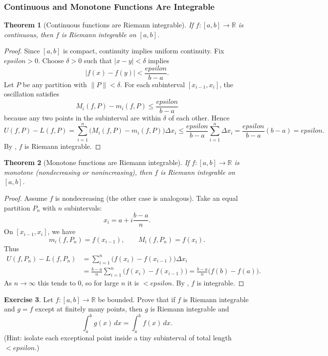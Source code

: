 \documentclass[12pt]{article}
\numberwithin{equation}{section}
\def\abs#1{|#1|}
\def\eps{epsilon}
\def\diff{d}
\newcommand{\RR}{\mathbb{R}}
\DeclarePairedDelimiter{\abs}{\lvert}{\rvert}
\newcommand{\eps}{\varepsilon}               %
\newcommand{\diff}{\mathop{}\!\mathrm{d}}    %
\theoremstyle{plain}
\newtheorem{theorem}{Theorem}[section]
\theoremstyle{definition}
\newtheorem{exercise}[theorem]{Exercise}
\theoremstyle{remark}
\begin{document}
\subsubsection{Continuous and Monotone Functions Are Integrable}

\begin{theorem}[Continuous functions are Riemann integrable]\label{thm:cont-int}
If $f:[a,b]\to\RR$ is continuous, then $f$ is Riemann integrable on $[a,b]$.
\end{theorem}

\begin{proof}
Since $[a,b]$ is compact, continuity implies uniform continuity.
Fix $\eps>0$.
Choose $\delta>0$ such that $\abs{x-y}<\delta$ implies
\[
\abs{f(x)-f(y)}<\frac{\eps}{b-a}.
\]
Let $P$ be any partition with $\|P\|<\delta$.
For each subinterval $[x_{i-1},x_i]$, the oscillation satisfies
\[
M_i(f,P)-m_i(f,P)\le \frac{\eps}{b-a}
\]
because any two points in the subinterval are within $\delta$ of each other.
Hence
\[
U(f,P)-L(f,P)
=\sum_{i=1}^n \bigl(M_i(f,P)-m_i(f,P)\bigr)\Delta x_i
\le \frac{\eps}{b-a}\sum_{i=1}^n \Delta x_i
=\frac{\eps}{b-a}(b-a)=\eps.
\]
By , $f$ is Riemann integrable.
\end{proof}

\begin{theorem}[Monotone functions are Riemann integrable]\label{thm:mono-int}
If $f:[a,b]\to\RR$ is monotone (nondecreasing or nonincreasing), then $f$ is Riemann integrable on $[a,b]$.
\end{theorem}

\begin{proof}
Assume $f$ is nondecreasing (the other case is analogous).
Take an equal partition $P_n$ with $n$ subintervals:
\[
x_i=a+i\frac{b-a}{n}.
\]
On $[x_{i-1},x_i]$, we have
\[
m_i(f,P_n)=f(x_{i-1}),\qquad M_i(f,P_n)=f(x_i).
\]
Thus
\begin{align*}
U(f,P_n)-L(f,P_n)
&=\sum_{i=1}^n \bigl(f(x_i)-f(x_{i-1})\bigr)\Delta x_i\\
&=\frac{b-a}{n}\sum_{i=1}^n \bigl(f(x_i)-f(x_{i-1})\bigr)
=\frac{b-a}{n}\bigl(f(b)-f(a)\bigr).
\end{align*}
As $n\to\infty$ this tends to $0$, so for large $n$ it is $<\eps$.
By , $f$ is integrable.
\end{proof}

\begin{exercise}
Let $f:[a,b]\to\RR$ be bounded. Prove that if $f$ is Riemann integrable and $g=f$ except at finitely many points, then $g$ is Riemann integrable and
\[
\int_a^b g(x)\,\diff x = \int_a^b f(x)\,\diff x.
\]
(Hint: isolate each exceptional point inside a tiny subinterval of total length $<\eps$.)
\end{exercise}
\end{document}
